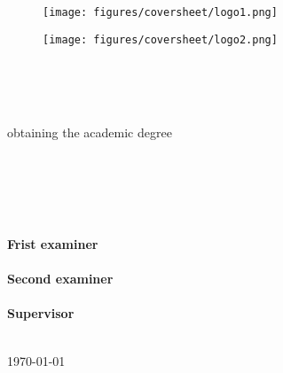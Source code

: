 \thispagestyle{empty}

\begin{figure}[htb]
    \centering
    \begin{minipage}[t]{0.45\linewidth}
        \centering
        \texttt{[image: figures/coversheet/logo1.png]}
    \end{minipage}
    \hfill
    \begin{minipage}[t]{0.45\linewidth}
        \centering
        \texttt{[image: figures/coversheet/logo2.png]}
    \end{minipage}
\end{figure}
\vspace{12mm}


\begin{center}
\LARGE{\textbf{\thesisTitle}}\\
\large{\thesisType} \\
\vspace{12mm}
\textbf{\degree} \\
{\mainWork}
\end{center}
\vspace{1mm}

\begin{center}
{obtaining the academic degree} \\
\textbf{\academicDegree}
\end{center}
\vspace{10mm}

\begin{center}
\Large{
{\faculty} \\
\textbf{\facultyName} \\
{\institute} \\
{\fieldOfWork} \\
}
\end{center}
\vspace{16mm}

\begin{center}
\large
\textbf{Frist examiner} \\
\firstExaminer \\
\vspace{4mm}
\textbf{Second examiner} \\
\secondExaminer \\
\vspace{4mm}
\textbf{Supervisor} \\
\supervisor \\
\end{center}
\vspace{6mm}

\begin{center}
\today
\end{center}